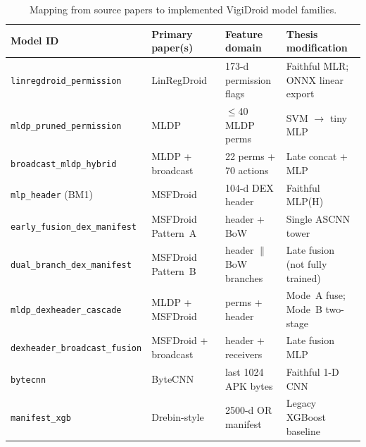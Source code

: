 \begin{table}[H]
\centering
\small
\setlength{\tabcolsep}{4pt}
\begin{tabular}{@{}p{2.8cm}p{3.2cm}p{2.4cm}p{4.2cm}@{}}
\toprule
\textbf{Model ID} & \textbf{Primary paper(s)} & \textbf{Feature domain} & \textbf{Thesis modification} \\
\midrule
\texttt{linregdroid\_permission} & LinRegDroid~\cite{linregdroid} & 173-d permission flags & Faithful MLR; ONNX linear export \\
\texttt{mldp\_pruned\_permission} & MLDP~\cite{mldp} & $\leq$40 MLDP perms & SVM $\rightarrow$ tiny MLP \\
\texttt{broadcast\_mldp\_hybrid} & MLDP + broadcast~\cite{mldp,broadcast} & 22 perms + 70 actions & Late concat + MLP \\
\texttt{mlp\_header} (BM1) & MSFDroid~\cite{msfdroid} & 104-d DEX header & Faithful MLP(H) \\
\texttt{early\_fusion\_dex\_manifest} & MSFDroid Pattern~A & header + BoW & Single ASCNN tower \\
\texttt{dual\_branch\_dex\_manifest} & MSFDroid Pattern~B & header $\|$ BoW branches & Late fusion (not fully trained) \\
\texttt{mldp\_dexheader\_cascade} & MLDP + MSFDroid & perms + header & Mode~A fuse; Mode~B two-stage \\
\texttt{dexheader\_broadcast\_fusion} & MSFDroid + broadcast & header + receivers & Late fusion MLP \\
\texttt{bytecnn} & ByteCNN~\cite{byteCNN} & last 1024 APK bytes & Faithful 1-D CNN \\
\texttt{manifest\_xgb} & Drebin-style~\cite{drebin} & 2500-d OR manifest & Legacy XGBoost baseline \\
\bottomrule
\end{tabular}
\caption{Mapping from source papers to implemented VigiDroid model families.}
\label{tab:paper-mapping}
\end{table}

